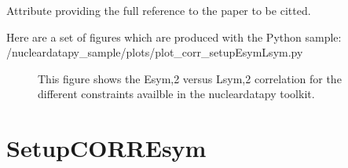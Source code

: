\documentclass[letterpaper,10pt,english]{sphinxmanual}
\begin{document}
\begin{fulllineitems}
\begin{fulllineitems}
\end{fulllineitems}


\begin{fulllineitems}
\label{\detokenize{source/api/setup_corr_EsymLsym:nucleardatapy.corr.setup_EsymLsym.setupEsymLsym.ref}}
\pysigstartsignatures
{}
\pysigstopsignatures
\sphinxAtStartPar
Attribute providing the full reference to the paper to be citted.

\end{fulllineitems}


\end{fulllineitems}


\sphinxAtStartPar
Here are a set of figures which are produced with the Python sample: /nucleardatapy\_sample/plots/plot\_corr\_setupEsymLsym.py

\begin{figure}[htbp]
\centering
\capstart

\noindent{}
\caption{This figure shows the Esym,2 versus Lsym,2 correlation for the different constraints availble in the nucleardatapy toolkit.}\label{\detokenize{source/api/setup_corr_EsymLsym:id1}}\end{figure}

\sphinxstepscope


\section{SetupCORREsym}
\label{\detokenize{source/api/setup_corr_Esym:setupcorresym}}\label{\detokenize{source/api/setup_corr_Esym::doc}}\label{\detokenize{source/api/setup_corr_Esym:module-nucleardatapy.corr.setup_Esym}}
\end{document}
